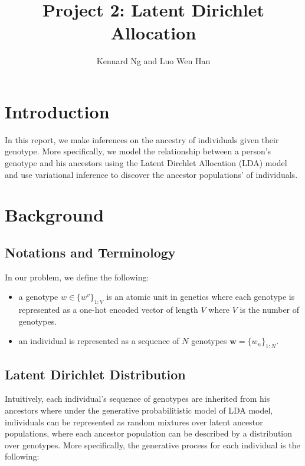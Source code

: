 \documentclass[a4paper]{article}
\author{Kennard Ng and Luo Wen Han}
\title{Project 2: Latent Dirichlet Allocation}
\begin{document}
	\maketitle
	\section{Introduction}
	
	
	In this report, we make inferences on the ancestry of individuals given their genotype. More specifically, we model the relationship between a person's genotype and his ancestors using the Latent Dirchlet Allocation (LDA) model~\cite{blei2003latent} and use variational inference to discover the ancestor populations' of individuals. 

	\section{Background}
	
	\subsection{Notations and Terminology}
	
	In our problem, we define the following:
	\begin{itemize}[noitemsep]
		\item a genotype $w \in \{w^v\}_{1:V}$ is an atomic unit in genetics where each genotype is represented as a one-hot encoded vector of length $V$ where $V$ is the number of genotypes. 
		\item an individual is represented as a sequence of $N$ genotypes $\mathbf{w} = \{w_n\}_{1:N}$.
	\end{itemize}
	
	
	\subsection{Latent Dirichlet Distribution}
	
	Intuitively, each individual's sequence of genotypes are inherited from his ancestors where under the generative probabilitistic model of LDA model, individuals can be represented as random mixtures over latent ancestor populations, where each ancestor population can be described by a distribution over genotypes. More specifically, the generative process for each individual is the following: 
	
\end{document}
